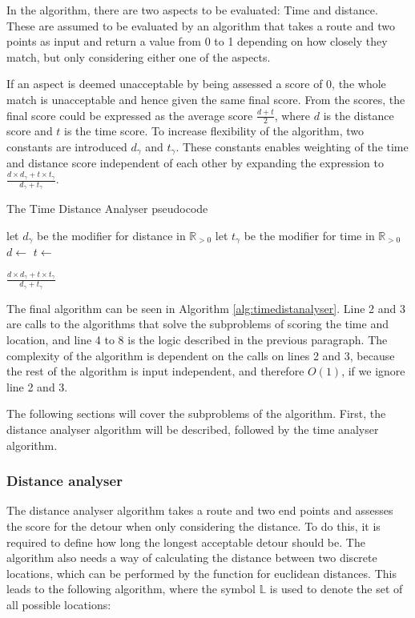 In the algorithm, there are two aspects to be evaluated: Time and distance.
These are assumed to be evaluated by an algorithm that takes a route and two points as input and return a value from 0 to 1 depending on how closely they match, but only considering either one of the aspects.

If an aspect is deemed unacceptable by being assessed a score of 0, the whole match is unacceptable and hence given the same final score.
From the scores, the final score could be expressed as the average score $\frac{d+t}{2}$, where $d$ is the distance score and $t$ is the time score.
To increase flexibility of the algorithm, two constants are introduced $d_\gamma$ and $t_\gamma$.
These constants enables weighting of the time and distance score independent of each other by expanding the expression to $\frac{d\times d_\gamma+t\times t_\gamma}{d_\gamma+t_\gamma}$.

\begin{algorithm}
	\caption{The Time Distance Analyser pseudocode}
	\label{alg:timedistanalyser}
	\begin{algorithmic}[1]
		\Require 
		\Statex let $d_\gamma$ be the modifier for distance in $\mathbb{R}_{>0}$
		\Statex let $t_\gamma$ be the modifier for time in $\mathbb{R}_{>0}$
		\Statex 
			\State $d\gets$
			\State $t\gets$
			
				\State \Return $\frac{d\times d_\gamma+t\times t_\gamma}{d_\gamma+t_\gamma}$
			\Else
				\State{}
			\EndIf
		\EndFunction
	\end{algorithmic}
\end{algorithm}

The final algorithm can be seen in Algorithm \ref{alg:timedistanalyser}.
Line 2 and 3 are calls to the algorithms that solve the subproblems of scoring the time and location, and line 4 to 8 is the logic described in the previous paragraph.
The complexity of the algorithm is dependent on the calls on lines 2 and 3, because the rest of the algorithm is input independent, and therefore $O(1)$, if we ignore line 2 and 3.

The following sections will cover the subproblems of the algorithm.
First, the distance analyser algorithm will be described, followed by the time analyser algorithm.

\subsubsection{Distance analyser}
The distance analyser algorithm takes a route and two end points and assesses the score for the detour when only considering the distance.
To do this, it is required to define how long the longest acceptable detour should be.
The algorithm also needs a way of calculating the distance between two discrete locations, which can be performed by the function for euclidean distances.
This leads to the following algorithm, where the symbol $\mathbb{L}$ is used to denote the set of all possible locations:


